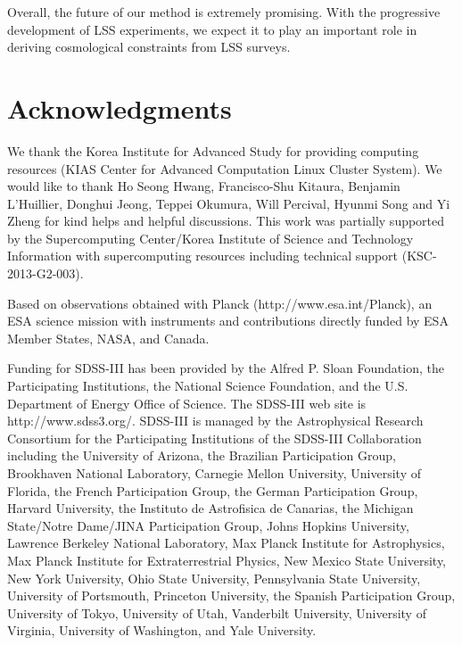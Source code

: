 \documentclass[iop]{emulateapj}
\begin{document}
Overall, the future of our method is extremely promising. 
With the progressive development of LSS experiments, 
we expect it to play an important role in deriving cosmological constraints from LSS surveys.



\section*{Acknowledgments}

We thank the Korea Institute for Advanced Study for providing computing resources (KIAS Center for Advanced Computation Linux Cluster System).
We would like to thank Ho Seong Hwang, Francisco-Shu Kitaura, Benjamin L'Huillier, Donghui Jeong, Teppei Okumura, Will Percival, Hyunmi Song 
and Yi Zheng for kind helps and helpful discussions.
This work was partially supported by the
Supercomputing Center/Korea Institute of Science and
Technology Information with supercomputing resources
including technical support (KSC-2013-G2-003).

Based on observations obtained with Planck (http://www.esa.int/Planck), 
an ESA science mission with instruments and contributions directly funded by 
ESA Member States, NASA, and Canada.

Funding for SDSS-III has been provided by the Alfred P. Sloan Foundation, the Participating Institutions, the
National Science Foundation, and the U.S. Department of Energy Office of Science. 
The SDSS-III web site is http://www.sdss3.org/. 
SDSS-III is managed by the Astrophysical Research Consortium for the Participating Institutions
of the SDSS-III Collaboration including the University of Arizona, the Brazilian Participation Group, Brookhaven
National Laboratory, Carnegie Mellon University, University of Florida, the French Participation Group, 
the German Participation Group, Harvard University, the Instituto de Astrofisica de Canarias, the Michigan State/Notre
Dame/JINA Participation Group, Johns Hopkins University, Lawrence Berkeley National Laboratory, Max Planck
Institute for Astrophysics, Max Planck Institute for Extraterrestrial Physics, New Mexico State University, New
York University, Ohio State University, Pennsylvania State
University, University of Portsmouth, Princeton University,
the Spanish Participation Group, University of Tokyo, University of Utah, Vanderbilt University, University of Virginia, 
University of Washington, and Yale University.
\end{document}
